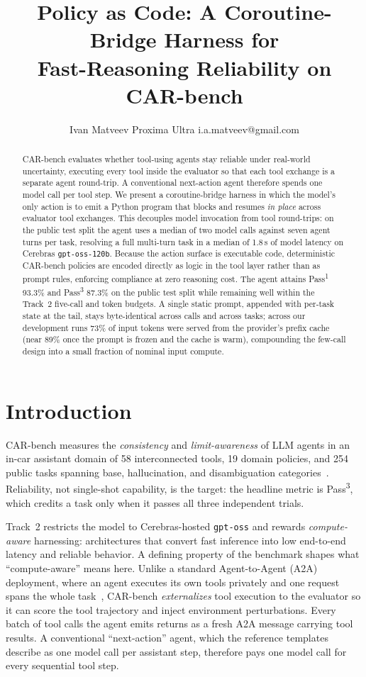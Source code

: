 \documentclass{article}
\title{Policy as Code: A Coroutine-Bridge Harness for\\ Fast-Reasoning Reliability on CAR-bench}
\author{
    Ivan Matveev
    \affiliations
    Proxima Ultra
    \emails
    i.a.matveev@gmail.com
}
\begin{document}
\maketitle

\begin{abstract}
CAR-bench evaluates whether tool-using agents stay reliable under real-world
uncertainty, executing every tool inside the evaluator so that each tool
exchange is a separate agent round-trip. A conventional next-action agent
therefore spends one model call per tool step. We present a coroutine-bridge
harness in which the model's only action is to emit a Python program that
blocks and resumes \emph{in place} across evaluator tool exchanges. This
decouples model invocation from tool round-trips: on the public test split the
agent uses a median of two model calls against seven agent turns per task,
resolving a full multi-turn task in a median of 1.8\,s of model latency on
Cerebras \texttt{gpt-oss-120b}. Because the action surface is executable code,
deterministic CAR-bench policies are encoded directly as logic in the tool
layer rather than as prompt rules, enforcing compliance at zero reasoning cost.
The agent attains Pass\textsuperscript{1} 93.3\% and Pass\textsuperscript{3}
87.3\% on the public test split while remaining well within the Track~2
five-call and token budgets. A single static prompt, appended with per-task
state at the tail, stays byte-identical across calls and across tasks; across
our development runs 73\% of input tokens were served from the provider's prefix
cache (near 89\% once the prompt is frozen and the cache is warm), compounding
the few-call design into a small fraction of nominal input compute.
\end{abstract}

\section{Introduction}

CAR-bench measures the \emph{consistency} and \emph{limit-awareness} of LLM
agents in an in-car assistant domain of 58 interconnected tools, 19 domain
policies, and 254 public tasks spanning base, hallucination, and
disambiguation categories~\cite{kirmayr2026carbench}. Reliability, not
single-shot capability, is the target: the headline metric is
Pass\textsuperscript{3}, which credits a task only when it passes all three
independent trials.

Track~2 restricts the model to Cerebras-hosted \texttt{gpt-oss} and rewards
\emph{compute-aware} harnessing: architectures that convert fast inference into
low end-to-end latency and reliable behavior. A defining property of the
benchmark shapes what ``compute-aware'' means here. Unlike a standard
Agent-to-Agent (A2A) deployment, where an agent executes its own tools
privately and one request spans the whole task~\cite{a2a2025}, CAR-bench
\emph{externalizes} tool execution to the evaluator so it can score the tool
trajectory and inject environment perturbations. Every batch of tool calls the
agent emits returns as a fresh A2A message carrying tool results. A
conventional ``next-action'' agent, which the reference templates describe as
one model call per assistant step, therefore pays one model call for every
sequential tool step.
\end{document}

